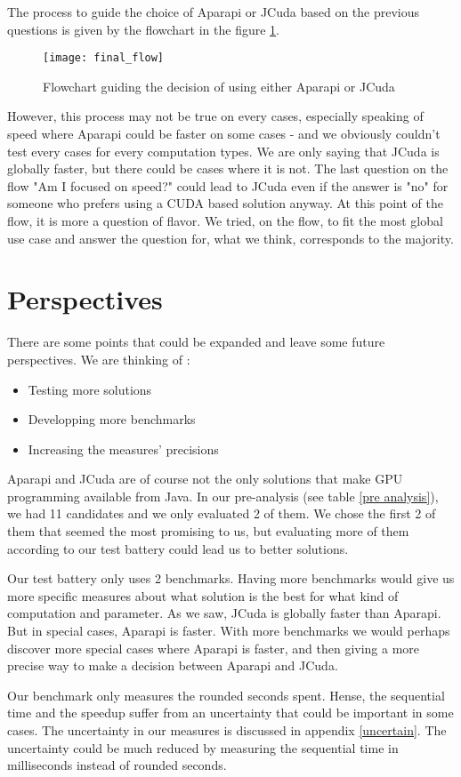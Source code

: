 The process to guide the choice of Aparapi or JCuda based on the previous questions is given by the flowchart in the figure \ref{fig: flow final choice}.

\begin{figure}[h]
\centering
\texttt{[image: final\_flow]}
\caption{Flowchart guiding the decision of using either Aparapi or JCuda}
\label{fig: flow final choice}
\end{figure}

However, this process may not be true on every cases, especially speaking of speed where Aparapi could be faster on some cases - and we obviously couldn't test every cases for every computation types. We are only saying that JCuda is globally faster, but there could be cases where it is not. The last question on the flow "Am I focused on speed?" could lead to JCuda even if the answer is "no" for someone who prefers using a CUDA based solution anyway. At this point of the flow, it is more a question of flavor. We tried, on the flow, to fit the most global use case and answer the question for, what we think, corresponds to the majority.

\section{Perspectives}

There are some points that could be expanded and leave some future perspectives. We are thinking of :

\begin{itemize}
  \item Testing more solutions
  \item Developping more benchmarks
  \item Increasing the measures' precisions
\end{itemize}

Aparapi and JCuda are of course not the only solutions that make GPU programming available from Java. In our pre-analysis (see table \ref{pre analysis}), we had 11 candidates and we only evaluated 2 of them. We chose the first 2 of them that seemed the most promising to us, but evaluating more of them according to our test battery could lead us to better solutions.

Our test battery only uses 2 benchmarks. Having more benchmarks would give us more specific measures about what solution is the best for what kind of computation and parameter. As we saw, JCuda is globally faster than Aparapi. But in special cases, Aparapi is faster. With more benchmarks we would perhaps discover more special cases where Aparapi is  faster, and then giving a more precise way to make a decision between Aparapi and JCuda.

Our benchmark only measures the rounded seconds spent. Hense, the sequential time and the speedup suffer from an uncertainty that could be important in some cases. The uncertainty in our measures is discussed in appendix \ref{uncertain}. The uncertainty could be much reduced by measuring the sequential time in milliseconds instead of rounded seconds.